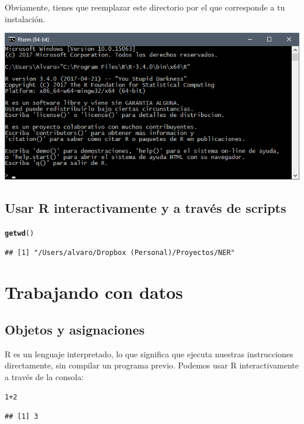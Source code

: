 \documentclass{article}\usepackage[]{graphicx}\usepackage[]{color}
\makeatletter
\newcommand{\hlnum}[1]{\textcolor[rgb]{0.686,0.059,0.569}{#1}}%
\newcommand{\hlopt}[1]{\textcolor[rgb]{0,0,0}{#1}}%
\newcommand{\hlstd}[1]{\textcolor[rgb]{0.345,0.345,0.345}{#1}}%
\newcommand{\hlkwd}[1]{\textcolor[rgb]{0.737,0.353,0.396}{\textbf{#1}}}%
\newenvironment{kframe}{%
 \def\at@end@of@kframe{}%
 \ifinner\ifhmode%
  \def\at@end@of@kframe{\end{minipage}}%
  \begin{minipage}{\columnwidth}%
 \fi\fi%
 \def\FrameCommand##1{\hskip\@totalleftmargin \hskip-\fboxsep
 \colorbox{shadecolor}{##1}\hskip-\fboxsep
     \hskip-\linewidth \hskip-\@totalleftmargin \hskip\columnwidth}%
 \MakeFramed {\advance\hsize-\width
   \@totalleftmargin\z@ \linewidth\hsize
   \@setminipage}}%
 {\par\unskip\endMakeFramed%
 \at@end@of@kframe}
\newenvironment{knitrout}{}{} %
\makeatother
\begin{document}
Obviamente, tienes que reemplazar este directorio por el que corresponde a tu instalación. 

\includegraphics[width=\linewidth]{sss/r-win-command-prompt}

\subsection{Usar R interactivamente y a través de scripts}

\begin{knitrout}
\color{fgcolor}\begin{kframe}
\begin{alltt}
\hlkwd{getwd}\hlstd{()}
\end{alltt}
\begin{verbatim}
## [1] "/Users/alvaro/Dropbox (Personal)/Proyectos/NER"
\end{verbatim}
\end{kframe}
\end{knitrout}



\section{Trabajando con datos}

\subsection{Objetos y asignaciones}

R es un lenguaje interpretado, lo que significa que ejecuta nuestras instrucciones directamente, sin compilar un programa previo. Podemos usar R interactivamente a través de la consola:
\begin{knitrout}
\color{fgcolor}\begin{kframe}
\begin{alltt}
\hlnum{1}\hlopt{+}\hlnum{2}
\end{alltt}
\begin{verbatim}
## [1] 3
\end{verbatim}
\end{kframe}
\end{knitrout}
\end{document}

